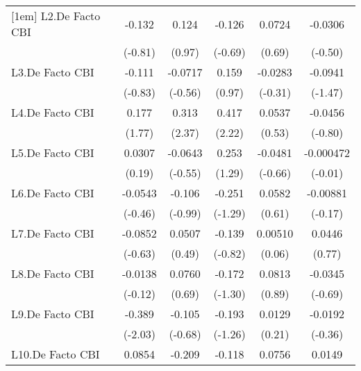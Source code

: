 {\begin{longtable}{l*{5}{c}}
[1em]
L2.De Facto CBI &   -0.132         &    0.124         &   -0.126         &   0.0724         &  -0.0306         \\
                &  (-0.81)         &   (0.97)         &  (-0.69)         &   (0.69)         &  (-0.50)         \\
[1em]
L3.De Facto CBI &   -0.111         &  -0.0717         &    0.159         &  -0.0283         &  -0.0941         \\
                &  (-0.83)         &  (-0.56)         &   (0.97)         &  (-0.31)         &  (-1.47)         \\
[1em]
L4.De Facto CBI &    0.177         &    0.313\sym{*}  &    0.417\sym{*}  &   0.0537         &  -0.0456         \\
                &   (1.77)         &   (2.37)         &   (2.22)         &   (0.53)         &  (-0.80)         \\
[1em]
L5.De Facto CBI &   0.0307         &  -0.0643         &    0.253         &  -0.0481         &-0.000472         \\
                &   (0.19)         &  (-0.55)         &   (1.29)         &  (-0.66)         &  (-0.01)         \\
[1em]
L6.De Facto CBI &  -0.0543         &   -0.106         &   -0.251         &   0.0582         & -0.00881         \\
                &  (-0.46)         &  (-0.99)         &  (-1.29)         &   (0.61)         &  (-0.17)         \\
[1em]
L7.De Facto CBI &  -0.0852         &   0.0507         &   -0.139         &  0.00510         &   0.0446         \\
                &  (-0.63)         &   (0.49)         &  (-0.82)         &   (0.06)         &   (0.77)         \\
[1em]
L8.De Facto CBI &  -0.0138         &   0.0760         &   -0.172         &   0.0813         &  -0.0345         \\
                &  (-0.12)         &   (0.69)         &  (-1.30)         &   (0.89)         &  (-0.69)         \\
[1em]
L9.De Facto CBI &   -0.389\sym{*}  &   -0.105         &   -0.193         &   0.0129         &  -0.0192         \\
                &  (-2.03)         &  (-0.68)         &  (-1.26)         &   (0.21)         &  (-0.36)         \\
[1em]
L10.De Facto CBI&   0.0854         &   -0.209         &   -0.118         &   0.0756         &   0.0149         \\

\end{longtable}}
